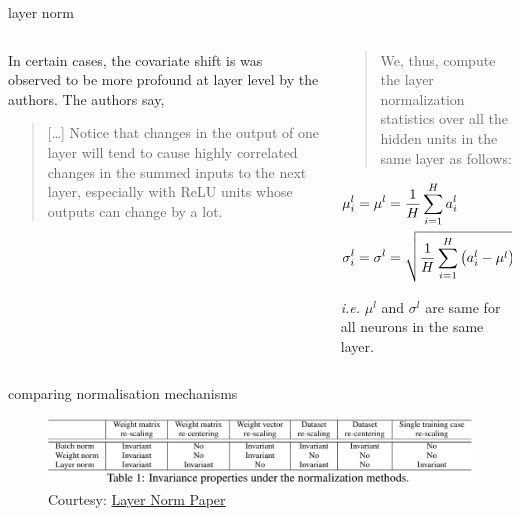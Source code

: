 \documentclass[aspectratio=169,xcolor={dvipsnames,svgnames}]{beamer}
\begin{document}
\begin{frame}[label={sec:org7d7fecd}]{layer norm}
\begin{columns}
\begin{column}{0.45\columnwidth}
In certain cases, the covariate shift is was observed
to be more profound at layer level by the authors.  The
authors say,

\begin{quote}
[\ldots] Notice that changes in the output of one layer
will tend to cause highly correlated changes in the
summed inputs to the next layer, especially with ReLU
units whose outputs can change by a lot.
\end{quote}
\end{column}
\begin{column}{0.55\columnwidth}
\begin{quote}
We, thus, compute the layer normalization statistics
over \alert{all the hidden units} in the same layer as
follows:
\end{quote}

\begin{align}
  \notag
  \mu_i^l = \mu^l
  &= \frac1H\sum_{i=1}^{H}a_i^l \\
  \notag
  \sigma_i^l = \sigma^l
  &= \sqrt{ \frac1H \sum_{i=1}^H \left( a_i^l - \mu^l
    \right)}
\end{align}

\emph{i.e.} \(\mu^{l}\) and \(\sigma^{l}\) are same for all
neurons in the same layer.
\end{column}
\end{columns}
\end{frame}

\begin{frame}[label={sec:org1272206}]{comparing normalisation mechanisms}
\begin{figure}[htbp]
\centering
\includegraphics[width=.9\linewidth]{org-download-images/Appendix/2024-08-20_03-20-24_screenshot.png}
\caption{Courtesy: \href{http://arxiv.org/abs/1607.06450}{Layer Norm Paper}}
\end{figure}
\end{frame}
\end{document}
